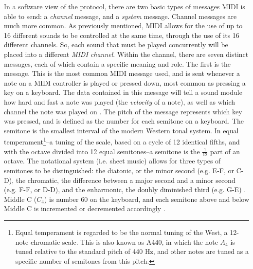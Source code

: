 In a software view of the protocol, there are two basic types of messages MIDI is able to send: a \textit{channel} message, and a \textit{system} message. Channel messages are much more common. As previously mentioned, MIDI allows for the use of up to 16 different sounds to be controlled at the same time, through the use of its 16 different channels. So, each sound that must be played concurrently will be placed into a different \textit{MIDI channel}. Within the channel, there are seven distinct messages, each of which contain a specific meaning and role. The first is the  message. This is the most common MIDI message used, and is sent whenever a note on a MIDI controller is played or pressed down, most common as pressing a key on a keyboard. The data contained in this message will tell a sound module how hard and fast a note was played (the \textit{velocity} of a note), as well as which channel the note was played on \cite{Romano_2003}. The pitch of the message represents which key was pressed, and is defined as the number for each semitone on a keyboard. The semitone is the smallest interval of the modern Western tonal system. In equal temperament\footnote{Equal temperament is regarded to be the normal tuning of the West, a 12-note chromatic scale. This is also known as A440, in which the note $A_4$ is tuned relative to the standard pitch of 440 Hz, and other notes are tuned as a specific number of semitones from this pitch.}--a tuning of the scale, based on a cycle of 12 identical fifths, and with the octave divided into 12 equal semitones--a semitone is the $\frac{1}{12}$ part of an octave. The notational system (i.e. sheet music) allows for three types of semitones to be distinguished: the diatonic, or the minor second (e.g. E-F, or C\musSharp{}-D), the chromatic, the difference between a major second and a minor second (e.g. F-F\musSharp{}, or D\musFlat{}-D), and the enharmonic, the doubly diminished third (e.g. G\musFlat{}\musFlat{}-E) \cite{Drabkin_Lindley_2001}. Middle C ($C_4$) is number 60 on the keyboard, and each semitone above and below Middle C is incremented or decremented accordingly \cite{Kirk_Hunt_2013}. 

